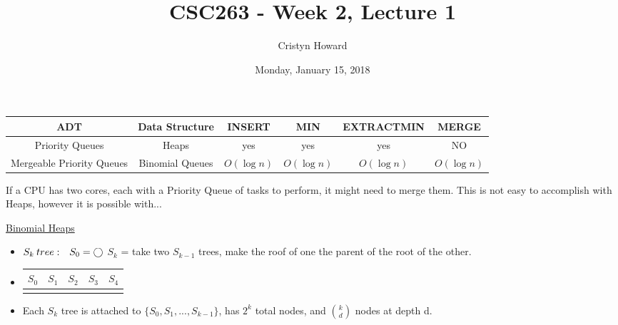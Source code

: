 \documentclass[12pt]{article}
\title{CSC263 - Week 2, Lecture 1}
\author{Cristyn Howard}
\date{Monday, January 15, 2018}
\newcommand\tab[1][0.25cm]{\hspace*{#1}}
\begin{document}
\maketitle


\begin{center}
\begin{tabular}{|c|c|c|c|c|c|}
\hline
ADT & Data Structure & INSERT & MIN & EXTRACTMIN & MERGE	\\
\hline
Priority Queues & Heaps & yes & yes & yes & NO \\
\hline
Mergeable Priority Queues & Binomial Queues & $O(\log{n})$ & $O(\log{n})$ & $O(\log{n})$ & $O(\log{n})$ \\
\hline
\end{tabular}
\end{center}
\vspace{0.4cm}

If a CPU has two cores, each with a Priority Queue of tasks to perform, it might need to merge them. This is not easy to accomplish with Heaps, however it is possible with...
\vspace{0.4cm}

\underline{Binomial Heaps}
\begin{itemize}
\item [] $S_k \: tree: \tab S_0 = \bigcirc$ \newline
	\tab[1.75cm] $S_k$ = take two $S_{k-1}$ trees, make the roof of one the parent of the root of the other.
	
\item [] \begin{center}
\begin{tabular}{|c|c|c|c|c|}
\hline
$S_0$ & $S_1$ & $S_2$ & $S_3$ & $S_4$ \\
\hline
\makecell{$\bigcirc$} & 
\makecell{ \Tree[.$\bigcirc$  $\bigcirc$  ] } & 
\makecell{ \Tree[.$\bigcirc$ [.$\bigcirc$ $\bigcirc$ ] $\bigcirc$ ] } & 
\makecell{\Tree[.$\bigcirc$ [.$\bigcirc$ [.$\bigcirc$ $\bigcirc$ ] $\bigcirc$ ][.$\bigcirc$ $\bigcirc$ ] $\bigcirc$ ] } & 
\makecell{\Tree[.$\bigcirc$ [.$\bigcirc$ [.$\bigcirc$ [.$\bigcirc$ $\bigcirc$ ] $\bigcirc$ ][.$\bigcirc$ $\bigcirc$ ] $\bigcirc$ ] [.$\bigcirc$ [.$\bigcirc$ $\bigcirc$ ] $\bigcirc$ ][.$\bigcirc$ $\bigcirc$ ] $\bigcirc$ ]}  \\
\hline
\end{tabular}
\end{center}

\item Each $S_k$ tree is attached to $\{S_0, S_1, ... , S_{k-1}\}$, has $2^k$ total nodes, and $\binom{k}{d}$ nodes at depth d.
\end{itemize} \vspace{0.4cm}
\end{document}
